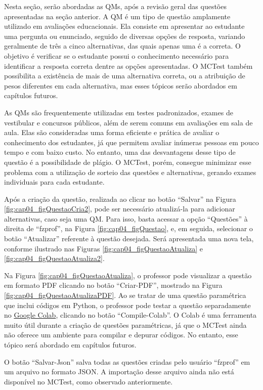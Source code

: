 Nesta seção, serão abordadas as QMs, após a revisão geral das questões apresentadas na seção anterior. A QM é um tipo de questão amplamente utilizado em avaliações educacionais. Ela consiste em apresentar ao estudante uma pergunta ou enunciado, seguido de diversas opções de resposta, variando geralmente de três a cinco alternativas, das quais apenas uma é a correta. O objetivo é verificar se o estudante possui o conhecimento necessário para identificar a resposta correta dentre as opções apresentadas. O MCTest também possibilita a existência de mais de uma alternativa correta, ou a atribuição de pesos diferentes em cada alternativa, mas esses tópicos serão abordados em capítulos futuros.

As QMs são frequentemente utilizadas em testes padronizados, exames de vestibular e concursos públicos, além de serem comuns em avaliações em sala de aula. Elas são consideradas uma forma eficiente e prática de avaliar o conhecimento dos estudantes, já que permitem avaliar inúmeras pessoas em pouco tempo e com baixo custo. No entanto, uma das desvantagens desse tipo de questão é a possibilidade de plágio. O MCTest, porém, consegue minimizar esse problema com a utilização de sorteio das questões e alternativas, gerando exames individuais para cada estudante.

Após a criação da questão, realizada ao clicar no botão ``Salvar'' na Figura \ref{fig:cap04_figQuestaoCria2}, pode ser necessário atualizá-la para adicionar alternativas, caso seja uma QM. Para isso, basta acessar a opção ``Questões'' à direita de ``fzprof'', na Figura \ref{fig:cap04_figQuestao}, e, em seguida, selecionar o botão ``Atualizar'' referente à questão desejada. Será apresentada uma nova tela, conforme ilustrado nas Figuras \ref{fig:cap04_figQuestaoAtualiza} e \ref{fig:cap04_figQuestaoAtualiza2}.

Na Figura \ref{fig:cap04_figQuestaoAtualiza}, o professor pode visualizar a questão em formato PDF clicando no botão ``Criar-PDF'', mostrado na Figura \ref{fig:cap04_figQuestaoAtualizaPDF}. Ao se tratar de uma questão paramétrica que inclui códigos em Python, o professor pode testar a questão separadamente no \href{https://colab.research.google.com/}{Google Colab}, clicando no botão ``Compile-Colab''. O Colab é uma ferramenta muito útil durante a criação de questões paramétricas, já que o MCTest ainda não oferece um ambiente para compilar e depurar códigos. No entanto, esse tópico será abordado em capítulos futuros.

O botão ``Salvar-Json'' salva todas as questões criadas pelo usuário ``fzprof'' em um arquivo no formato JSON. A importação desse arquivo ainda não está disponível no MCTest, como observado anteriormente. 

